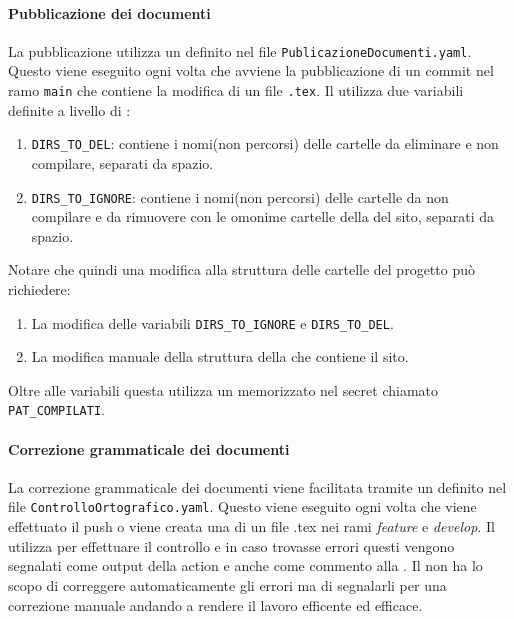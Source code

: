 \paragraph{Pubblicazione dei documenti}
\label{par:pubblicazione_documenti}
La pubblicazione utilizza un  definito nel file \texttt{PublicazioneDocumenti.yaml}.
Questo  viene eseguito ogni volta che avviene la pubblicazione di un commit nel ramo \texttt{main} che contiene la modifica di un file \texttt{.tex}.
Il  utilizza due variabili definite a livello di :
\begin{enumerate}
    \item \texttt{DIRS\_TO\_DEL}: contiene i nomi(non percorsi) delle cartelle da eliminare e non compilare, separati da spazio.
    \item \texttt{DIRS\_TO\_IGNORE}: contiene i nomi(non percorsi) delle cartelle da non compilare e da rimuovere con le omonime cartelle della  del sito, separati da spazio.
\end{enumerate}
Notare che quindi una modifica alla struttura delle cartelle del progetto può richiedere:
\begin{enumerate}
    \item La modifica delle variabili \texttt{DIRS\_TO\_IGNORE} e \texttt{DIRS\_TO\_DEL}.
    \item La modifica manuale della struttura della  che contiene il sito.
\end{enumerate}
Oltre alle variabili questa  utilizza un \textbf{} memorizzato nel secret chiamato \texttt{PAT\_COMPILATI}.

\paragraph{Correzione grammaticale dei documenti}
\label{par:correzione_grammaticale}
La correzione grammaticale dei documenti viene facilitata tramite un  definito nel file \texttt{ControlloOrtografico.yaml}.
Questo  viene eseguito ogni volta che viene effettuato il push o viene creata una  di un file .tex nei rami \textit{feature} e \textit{develop}.
Il  utilizza  per effettuare il controllo e in caso trovasse errori questi vengono segnalati come output della action e anche come commento alla .
Il  non ha lo scopo di correggere automaticamente gli errori ma di segnalarli per una correzione manuale andando a rendere il lavoro efficente ed efficace. 

